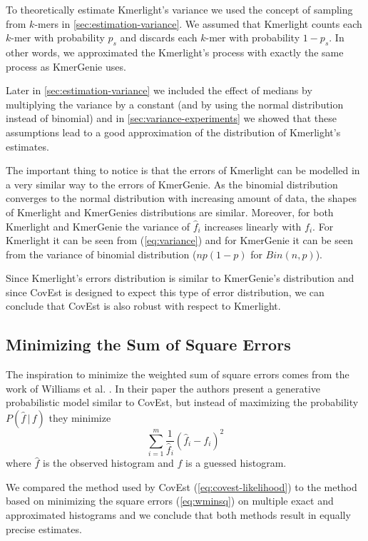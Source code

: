 \medskip

To theoretically estimate Kmerlight's variance we used the concept of sampling from $k$-mers in 
\ref{sec:estimation-variance}. We assumed that Kmerlight counts each $k$-mer with probability 
$p_s$ and discards each $k$-mer with probability $1 - p_s$. In other words, we approximated 
the Kmerlight's process with exactly the same process as KmerGenie uses. 

Later in \ref{sec:estimation-variance} we included the effect of medians by multiplying the 
variance by a constant (and by using the normal distribution instead of binomial) 
and in \ref{sec:variance-experiments} we showed that these assumptions lead to a good 
approximation of the distribution of Kmerlight's estimates.

The important thing to notice is that the errors of Kmerlight can be modelled in a very similar 
way to the errors of KmerGenie. As the binomial distribution converges to the normal distribution 
with increasing amount of data, the shapes of Kmerlight and KmerGenies distributions are similar.
Moreover, for both Kmerlight and KmerGenie the variance of $\hat f_i$ increases linearly with 
$f_i$. For Kmerlight it can be seen from (\ref{eq:variance}) and for KmerGenie it can be seen 
from the variance of binomial distribution ($np(1-p)$ for $Bin(n,p)$). 

Since Kmerlight's errors distribution is similar to KmerGenie's distribution
and since CovEst is designed to expect this type of error distribution,
we can conclude that CovEst is also robust with respect to Kmerlight.




\subsection{Minimizing the Sum of Square Errors}
The inspiration to minimize the weighted sum of square errors comes from the work of
Williams et al. \cite{Williams2013}. In their paper the authors present a generative probabilistic
model similar to CovEst, but instead of maximizing the probability $P(\hat f\,|\,f)$ they
minimize
\begin{equation} \label{eq:wminsq}
\sum_{i=1}^m \frac{1}{\hat f_i}(\hat f_i - f_i)^2
\end{equation}
where $\hat f$ is the observed histogram and $f$ is a guessed histogram.

We compared the method used by CovEst (\ref{eq:covest-likelihood}) to the method
based on minimizing the square errors (\ref{eq:wminsq}) on multiple exact and approximated
histograms and we conclude that both methods result in equally precise estimates.

